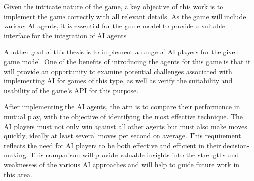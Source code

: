 Given the intricate nature of the game, a key objective of this work is to implement the game correctly with all relevant details. As the game will include various AI agents, it is essential for the game model to provide a suitable interface for the integration of AI agents. 

Another goal of this thesis is to implement a range of AI players for the given game model. One of the benefits of introducing the agents for this game is that it will provide an opportunity to examine potential challenges associated with implementing AI for games of this type, as well as verify the suitability and usability of the game's API for this purpose.

After implementing the AI agents, the aim is to compare their performance in mutual play, with the objective of identifying the most effective technique. The AI players must not only win against all other agents but must also make moves quickly, ideally at least several moves per second on average. This requirement reflects the need for AI players to be both effective and efficient in their decision-making. This comparison will provide valuable insights into the strengths and weaknesses of the various AI approaches and will help to guide future work in this area. 
